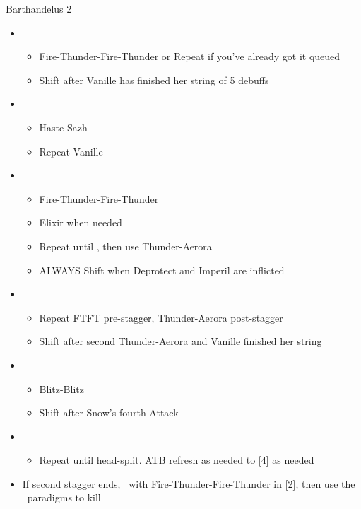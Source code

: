 \begin{battle}[2:30 $|$ 2:15]{Barthandelus 2}
\begin{multicols}{2}
\begin{itemize}
      \item \fifth
            \begin{itemize}
              \item Fire-Thunder-Fire-Thunder or Repeat if you've already got it queued
              \item Shift after Vanille has finished her string of 5 debuffs
            \end{itemize}
      \item \first
            \begin{itemize}
              \item Haste Sazh
              \item Repeat Vanille
            \end{itemize}
      \item \fifth
            \begin{itemize}
              \item Fire-Thunder-Fire-Thunder
              \item Elixir when needed
              \item Repeat until \stagger, then use Thunder-Aerora
              \item ALWAYS Shift when Deprotect and Imperil are inflicted
            \end{itemize}
      \item \second
            \begin{itemize}
              \item Repeat FTFT pre-stagger, Thunder-Aerora post-stagger
              \item Shift after second Thunder-Aerora and Vanille finished her string
            \end{itemize}
      \item \fourth
            \begin{itemize}
              \item Blitz-Blitz
              \item Shift after Snow's fourth Attack
            \end{itemize}
      \item \sixth
            \begin{itemize}
              \item Repeat until head-split. ATB refresh as needed to [4] as needed
            \end{itemize}
      \item If second stagger ends, \stagger\ with \linebreak Fire-Thunder-Fire-Thunder in [2], then use the \com\ paradigms to kill
    \end{itemize}
    \null
  \end{multicols}
\end{battle}
